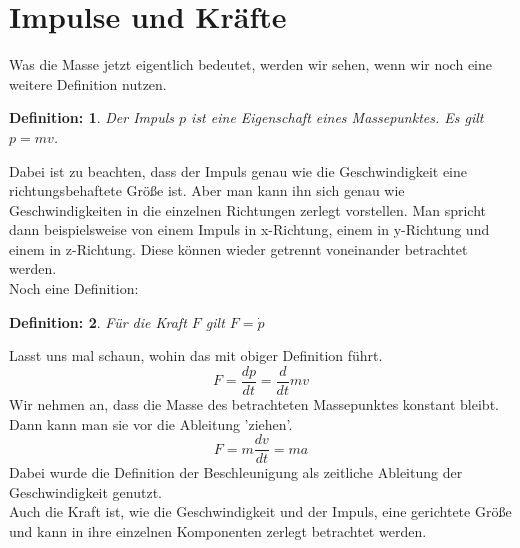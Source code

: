 \documentclass[a4paper, twocolumn, 9pt]{article}
\newtheorem*{definition}{Definition:}
\begin{document}
\section*{Impulse und Kräfte}
Was die Masse jetzt eigentlich bedeutet, werden wir sehen, wenn wir noch eine weitere Definition nutzen.
\begin{definition}
Der Impuls $p$ ist eine Eigenschaft eines Massepunktes. Es gilt $p=mv$.
\end{definition}
Dabei ist zu beachten, dass der Impuls genau wie die Geschwindigkeit eine richtungsbehaftete Größe ist. Aber man kann ihn sich genau wie Geschwindigkeiten in die einzelnen Richtungen zerlegt vorstellen. Man spricht dann beispielsweise von einem Impuls in x-Richtung, einem in y-Richtung und einem in z-Richtung. Diese können wieder getrennt voneinander betrachtet werden.\\
Noch eine Definition:
\begin{definition}
Für die Kraft $F$ gilt $F=\dot{p}$ 
\end{definition}
Lasst uns mal schaun, wohin das mit obiger Definition führt.
\begin{equation*}
F=\frac{dp}{dt}=\frac{d}{dt}mv    
\end{equation*}
Wir nehmen an, dass die Masse des betrachteten Massepunktes konstant bleibt. Dann kann man sie vor die Ableitung 'ziehen'.
\begin{equation*}
F=m\frac{dv}{dt}=ma    
\end{equation*}
Dabei wurde die Definition der Beschleunigung als zeitliche Ableitung der Geschwindigkeit genutzt.\\
Auch die Kraft ist, wie die Geschwindigkeit und der Impuls, eine gerichtete Größe und kann in ihre einzelnen Komponenten zerlegt betrachtet werden.
\end{document}
